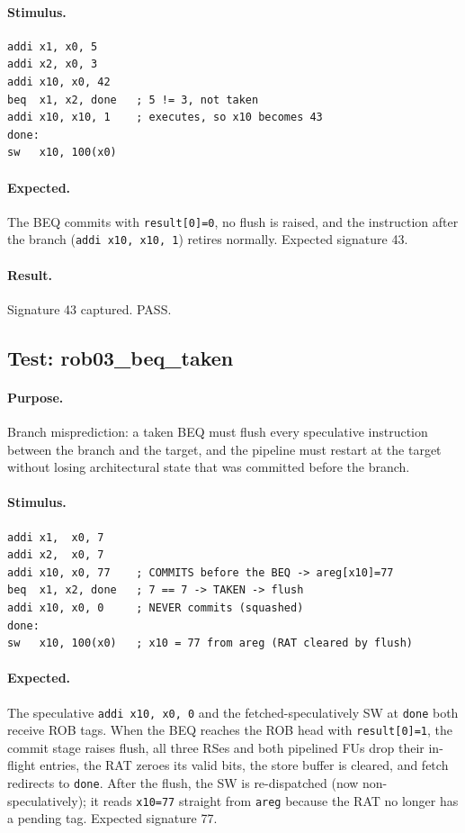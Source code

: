 \documentclass[11pt]{article}
\begin{document}
\paragraph{Stimulus.}
\begin{lstlisting}[style=verilog, caption=BEQ not taken (rob02\_beq\_not\_taken.s)]
addi x1, x0, 5
addi x2, x0, 3
addi x10, x0, 42
beq  x1, x2, done   ; 5 != 3, not taken
addi x10, x10, 1    ; executes, so x10 becomes 43
done:
sw   x10, 100(x0)
\end{lstlisting}

\paragraph{Expected.}
The BEQ commits with \texttt{result[0]=0}, no flush is raised, and the
instruction after the branch (\texttt{addi x10, x10, 1}) retires normally.
Expected signature 43.

\paragraph{Result.} Signature 43 captured. PASS.

\subsection{Test: rob03\_beq\_taken}

\paragraph{Purpose.}
Branch misprediction: a taken BEQ must flush every speculative instruction
between the branch and the target, and the pipeline must restart at the target
without losing architectural state that was committed before the branch.

\paragraph{Stimulus.}
\begin{lstlisting}[style=verilog, caption=BEQ taken (rob03\_beq\_taken.s)]
addi x1,  x0, 7
addi x2,  x0, 7
addi x10, x0, 77    ; COMMITS before the BEQ -> areg[x10]=77
beq  x1, x2, done   ; 7 == 7 -> TAKEN -> flush
addi x10, x0, 0     ; NEVER commits (squashed)
done:
sw   x10, 100(x0)   ; x10 = 77 from areg (RAT cleared by flush)
\end{lstlisting}

\paragraph{Expected.}
The speculative \texttt{addi x10, x0, 0} and the fetched-speculatively SW at
\texttt{done} both receive ROB tags. When the BEQ reaches the ROB head with
\texttt{result[0]=1}, the commit stage raises flush, all three RSes and both
pipelined FUs drop their in-flight entries, the RAT zeroes its valid bits,
the store buffer is cleared, and fetch redirects to \texttt{done}. After the
flush, the SW is re-dispatched (now non-speculatively); it reads
\texttt{x10=77} straight from \texttt{areg} because the RAT no longer has a
pending tag. Expected signature 77.
\end{document}
